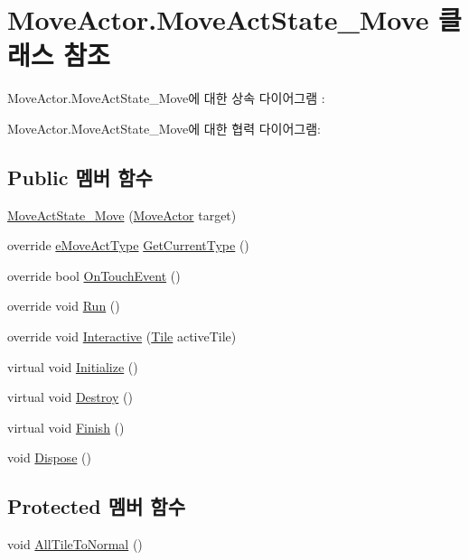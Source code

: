 \hypertarget{class_move_actor_1_1_move_act_state___move}{}\section{Move\+Actor.\+Move\+Act\+State\+\_\+\+Move 클래스 참조}
\label{class_move_actor_1_1_move_act_state___move}


Move\+Actor.\+Move\+Act\+State\+\_\+\+Move에 대한 상속 다이어그램 \+: 


Move\+Actor.\+Move\+Act\+State\+\_\+\+Move에 대한 협력 다이어그램\+:
\subsection*{Public 멤버 함수}
\begin{DoxyCompactItemize}
\item 
\hyperlink{class_move_actor_1_1_move_act_state___move_a6ddbd333a6e1257b76f216b0ce0aa346}{Move\+Act\+State\+\_\+\+Move} (\hyperlink{class_move_actor}{Move\+Actor} target)
\item 
override \hyperlink{_move_actor_8cs_a1df5a2532cc7e6bde40a57d2dcbe23fe}{e\+Move\+Act\+Type} \hyperlink{class_move_actor_1_1_move_act_state___move_a73427cca28d6ef331ac92a94cc68a4d7}{Get\+Current\+Type} ()
\item 
override bool \hyperlink{class_move_actor_1_1_move_act_state___move_a1479015d5a3fde396b2c480bfb1bcffb}{On\+Touch\+Event} ()
\item 
override void \hyperlink{class_move_actor_1_1_move_act_state___move_a8eb57e77a4d5d6e1e0b2f6ccf8532d73}{Run} ()
\item 
override void \hyperlink{class_move_actor_1_1_move_act_state___move_a82e0eb4bd7a3e7eae9bbe9897d75a516}{Interactive} (\hyperlink{class_tile}{Tile} active\+Tile)
\item 
virtual void \hyperlink{class_f_z_1_1_state_a27ac6fd2e844476017b35aa781d73c8c}{Initialize} ()
\item 
virtual void \hyperlink{class_f_z_1_1_state_aa85fdf4a5495d6d5d3ed4aeda3497c8a}{Destroy} ()
\item 
virtual void \hyperlink{class_f_z_1_1_state_a288bb8c3fceee4bf03f01e295dcef1be}{Finish} ()
\item 
void \hyperlink{class_f_z_1_1_state_a598887d3fbb412fada132dc1c079b25b}{Dispose} ()
\end{DoxyCompactItemize}
\subsection*{Protected 멤버 함수}
\begin{DoxyCompactItemize}
\item 
void \hyperlink{class_move_actor_1_1_move_act_state_a8e1d5e7942d4f9de8c8e0732964c554b}{All\+Tile\+To\+Normal} ()
\end{DoxyCompactItemize}
